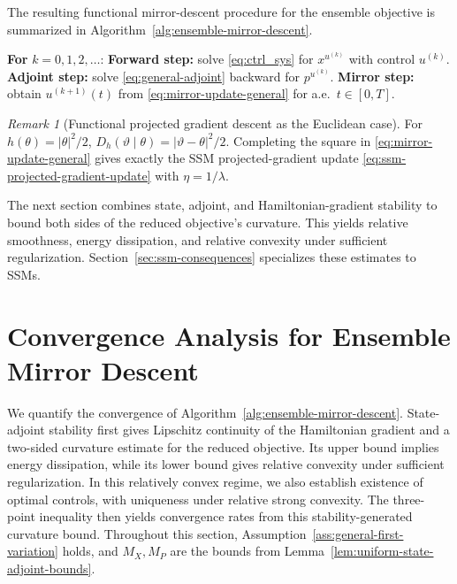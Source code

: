 \documentclass[11pt]{amsart}
\numberwithin{equation}{section} %
\theoremstyle{remark}
\newtheorem{remark}{Remark}[section]
\begin{document}
The resulting functional mirror-descent procedure for the ensemble objective is
summarized in
Algorithm~\ref{alg:ensemble-mirror-descent}.

\medskip

\begin{algorithm}[H]
\DontPrintSemicolon
\caption{Bregman mirror descent for ensemble control}
\label{alg:ensemble-mirror-descent}
\textbf{For} $k=0,1,2,\ldots$:\;
\Indp
\textbf{Forward step:} solve \eqref{eq:ctrl_sys} for
$x^{u^{(k)}}$ with control $u^{(k)}$.\;
\textbf{Adjoint step:} solve \eqref{eq:general-adjoint}
backward for $p^{u^{(k)}}$.\;
\textbf{Mirror step:} obtain $u^{(k+1)}(t)$ from
\eqref{eq:mirror-update-general} for a.e.\ $t\in[0,T]$.\;
\Indm
\end{algorithm}

\begin{remark}[Functional projected gradient descent as the Euclidean case]
\label{rem:euclidean-mirror-ssm}
For $h(\theta)=|\theta|^2/2$,
$D_h(\vartheta\mid\theta)=|\vartheta-\theta|^2/2$.
Completing the square in \eqref{eq:mirror-update-general} gives
exactly the SSM projected-gradient update
\eqref{eq:ssm-projected-gradient-update} with $\eta=1/\lambda$.
\end{remark}

The next section combines state, adjoint, and Hamiltonian-gradient
stability to bound both sides of the reduced objective's curvature.
This yields relative smoothness, energy dissipation, and relative
convexity under sufficient regularization.
Section~\ref{sec:ssm-consequences} specializes these estimates to SSMs.


\section{Convergence Analysis for Ensemble Mirror Descent}
\label{sec:ensemble-mirror-convergence}

We quantify the convergence of Algorithm~\ref{alg:ensemble-mirror-descent}.
State-adjoint stability first gives Lipschitz continuity of the Hamiltonian gradient and a two-sided curvature estimate for the reduced objective. Its upper bound implies energy dissipation, while its lower bound gives relative convexity under sufficient regularization. In this relatively convex regime, we also establish existence of optimal controls, with uniqueness under relative strong convexity. The three-point inequality then yields convergence rates from this stability-generated curvature bound.
Throughout this section, Assumption~\ref{ass:general-first-variation} holds, and \(M_X,M_P\) are the bounds from Lemma~\ref{lem:uniform-state-adjoint-bounds}.
\end{document}
